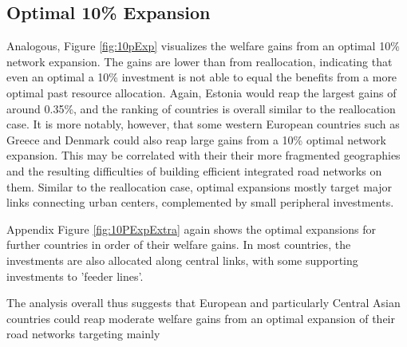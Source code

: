 \documentclass[a4paper]{article}
\begin{document}
\subsection*{Optimal 10\% Expansion}

Analogous, Figure \ref{fig:10pExp} visualizes the welfare gains from an optimal 10\% network expansion. The gains are lower than from reallocation, indicating that even an optimal a 10\% investment is not able to equal the benefits from a more optimal past resource allocation. Again, Estonia would reap the largest gains of around 0.35\%, and the ranking of countries is overall similar to the reallocation case. It is more notably, however, that some western European countries such as Greece and Denmark could also reap large gains from a 10\% optimal network expansion. This may be correlated with their their more fragmented geographies and the resulting difficulties of building efficient integrated road networks on them. Similar to the reallocation case, optimal expansions mostly target major links connecting urban centers, complemented by small peripheral investments. \newline 

Appendix Figure \ref{fig:10PExpExtra} again shows the optimal expansions for further countries in order of their welfare gains. In most countries, the investments are also allocated along central links, with some supporting investments to 'feeder lines'. \newline

The analysis overall thus suggests that European and particularly Central Asian countries could reap moderate welfare gains from an optimal expansion of their road networks targeting mainly
\end{document}
